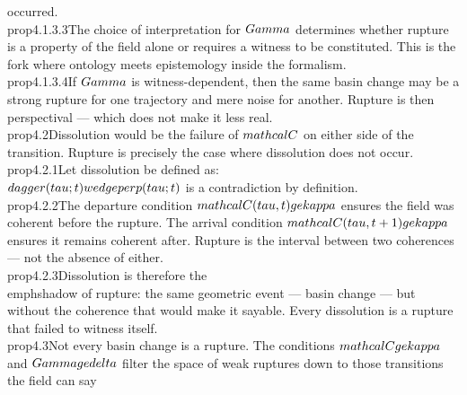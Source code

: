 {occurred.}\n\n\\prop{4.1.3.3}{The choice of interpretation for $\\Gamma$ determines whether rupture is a property of the field alone or requires a witness to be constituted. This is the fork where ontology meets epistemology inside the formalism.}\n\n\\prop{4.1.3.4}{If $\\Gamma$ is witness-dependent, then the same basin change may be a strong rupture for one trajectory and mere noise for another. Rupture is then perspectival — which does not make it less real.}\n\n\\prop{4.2}{Dissolution would be the failure of $\\mathcal{C}$ on either side of the transition. Rupture is precisely the case where dissolution does not occur.}\n\n\\prop{4.2.1}{Let dissolution be defined as:\n\\[\n\\perp(\\tau;t) := \\mathcal{C}(\\tau,t+1) < \\kappa.\n\\]\nThen $\\dagger(\\tau;t) \\wedge \\perp(\\tau;t)$ is a contradiction by definition.}\n\n\\prop{4.2.2}{The departure condition $\\mathcal{C}(\\tau,t)\\ge \\kappa$ ensures the field was coherent before the rupture. The arrival condition $\\mathcal{C}(\\tau,t+1)\\ge \\kappa$ ensures it remains coherent after. Rupture is the interval between two coherences — not the absence of either.}\n\n\\prop{4.2.3}{Dissolution is therefore the \\emph{shadow} of rupture: the same geometric event — basin change — but without the coherence that would make it sayable. Every dissolution is a rupture that failed to witness itself.}\n\n\\prop{4.3}{Not every basin change is a rupture. The conditions $\\mathcal{C} \\ge \\kappa$ and $\\Gamma \\ge \\delta$ filter the space of weak ruptures down to those transitions the field can say }
